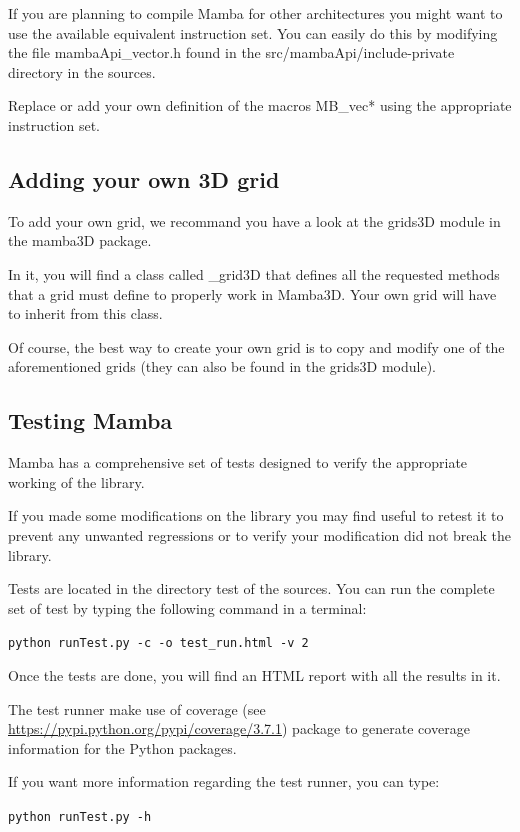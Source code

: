 \documentclass[a4paper,10pt,oneside]{article}
\begin{document}
If you are planning to compile Mamba for other architectures you might want to
use the available equivalent instruction set. You can easily do this by modifying
the file mambaApi\_vector.h found in the src/mambaApi/include-private directory
in the sources.

Replace or add your own definition of the macros MB\_vec* using the appropriate
instruction set.

\subsection{Adding your own 3D grid}
\label{cha:create_grid3D}

To add your own grid, we recommand you have a look at the grids3D module in
the mamba3D package.

In it, you will find a class called \_grid3D that defines all the requested
methods that a grid must define to properly work in Mamba3D. Your own grid
will have to inherit from this class.

Of course, the best way to create your own grid is to copy and modify one
of the aforementioned grids (they can also be found in the grids3D module).

\subsection{Testing Mamba}
\label{cha:testing_mamba}

Mamba has a comprehensive set of tests designed to verify the appropriate
working of the library.

If you made some modifications on the library you may find useful to retest it
to prevent any unwanted regressions or to verify your modification did not break
the library.

Tests are located in the directory test of the sources. You can run the complete
set of test by typing the following command in a terminal:

\texttt{python runTest.py -c -o test\_run.html -v 2}

Once the tests are done, you will find an HTML report with all the results in it.

The test runner make use of coverage (see \url{https://pypi.python.org/pypi/coverage/3.7.1})
package to generate coverage information for the Python packages.

If you want more information regarding the test runner, you can type:

\texttt{python runTest.py -h}
\end{document}
